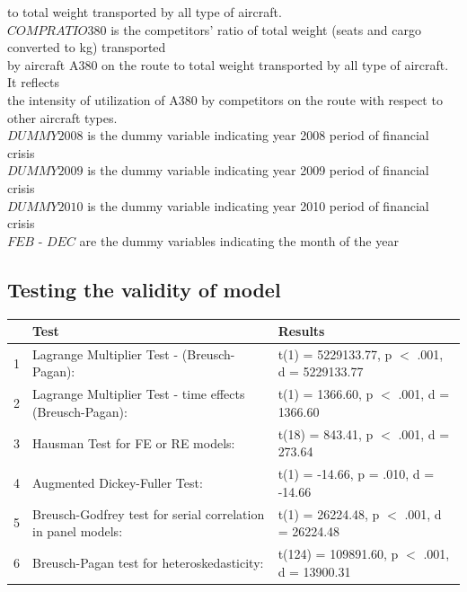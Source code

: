 \documentclass[titlepage, 11pt]{article}
\begin{document}
\tab to total weight transported by all type of aircraft. \\
$COMPRATIO380$ is the competitors' ratio of total weight (seats and cargo converted to kg) transported \\ 
\tab by aircraft A380 on the route to total weight transported by all type of aircraft. It  reflects \\ 
\tab the intensity of utilization of A380 by competitors on the route with respect to other aircraft types. \\
$DUMMY2008$ is the dummy variable indicating year 2008 period of financial crisis\\
$DUMMY2009$ is the dummy variable indicating year 2009 period of financial crisis\\
$DUMMY2010$ is the dummy variable indicating year 2010 period of financial crisis\\ 
$FEB$ - $DEC$ are the dummy variables indicating the month of the year 
\subsection{Testing the validity of model}  

\begin{table}[ht]
\centering
\label{test}
\begin{tabular}{rll}
 & Test & Results \\ 
  \hline

1 & Lagrange Multiplier Test -  (Breusch-Pagan): & t(1) = 5229133.77, p $<$ .001, d = 5229133.77 \\
2 & Lagrange Multiplier Test - time effects (Breusch-Pagan): & t(1) = 1366.60, p $<$ .001, d = 1366.60 \\
3 & Hausman Test for FE or RE models: & t(18) = 843.41, p $<$ .001, d = 273.64 \\ 
4 & Augmented Dickey-Fuller Test: & t(1) = -14.66, p = .010, d = -14.66 \\ 
5 & Breusch-Godfrey test for serial correlation in panel models: & t(1) = 26224.48, p $<$ .001, d = 26224.48 \\ 
6 & Breusch-Pagan test for heteroskedasticity: & t(124) = 109891.60, p $<$ .001, d = 13900.31 \\ 
\end{tabular}
\end{table}
\end{document}
